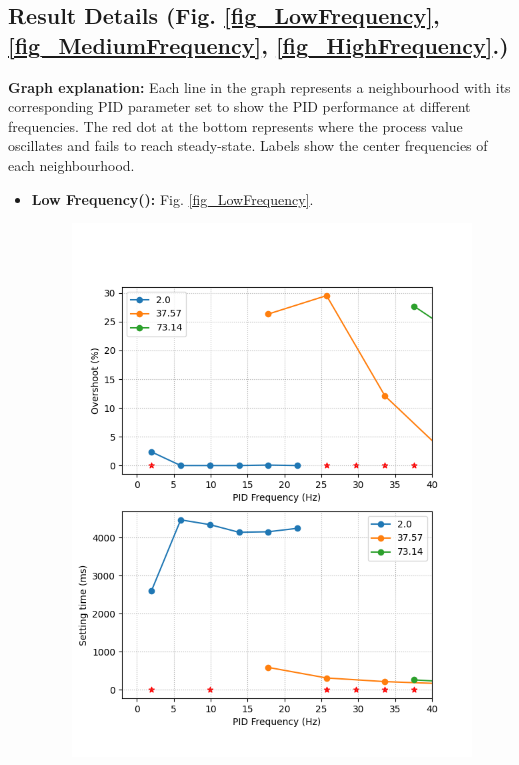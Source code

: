 \documentclass[conference]{IEEEtran}
\begin{document}
\subsection{Result Details (Fig. \ref{fig_LowFrequency}, \ref{fig_MediumFrequency}, \ref{fig_HighFrequency}.) } 
    \textbf{Graph explanation:} Each line in the graph represents a neighbourhood with its corresponding PID parameter set to show the PID performance at different frequencies. The red dot at the bottom represents where the process value oscillates and fails to reach steady-state. Labels show the center frequencies of each neighbourhood.
\begin{itemize}
    \item \textbf{Low Frequency():} Fig. \ref{fig_LowFrequency}.
        \begin{figure}[htbp]
        \centerline{\includegraphics[width=\linewidth]{Report/Pic/ResultLowFrequency_2.png}}

\end{figure}
\end{itemize}
\end{document}

